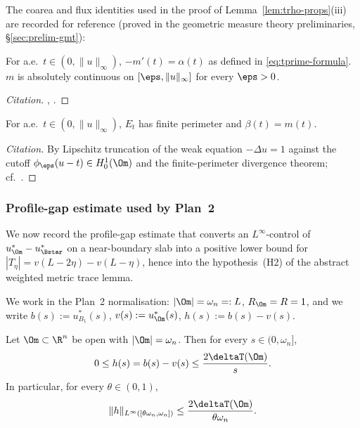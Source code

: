 The coarea and flux identities used in the proof of
Lemma~\ref{lem:trho-props}(iii) are recorded for reference (proved in
the geometric measure theory preliminaries,
\S\ref{sec:prelim-gmt}):

\begin{lemma}\label{lem:coarea-mprime}
For a.e.\ $t\in(0,\|u\|_\infty)$, $-m'(t)=\alpha(t)$ as defined in
\eqref{eq:tprime-formula}. $m$ is absolutely continuous on
$[\eps,\|u\|_\infty]$ for every $\eps>0$.
\end{lemma}

\begin{proof}[Citation]
\cite[Thm.~13.1]{Maggi2012}, \cite[Thm.~3.40]{AFP2000}.
\end{proof}

\begin{lemma}\label{lem:flux-id}
For a.e.\ $t\in(0,\|u\|_\infty)$, $E_t$ has finite perimeter and
$\beta(t)=m(t)$.
\end{lemma}

\begin{proof}[Citation]
By Lipschitz truncation of the weak equation $-\Delta u=1$ against the
cutoff $\phi_\eps(u-t)\in H^{1}_{0}(\Om)$ and the finite-perimeter
divergence theorem; cf.\ \cite[Thm.~16.3]{Maggi2012}.
\end{proof}

\subsubsection{Profile-gap estimate used by Plan~2}\label{ssec:profile-gap}

We now record the profile-gap estimate that converts an
$L^\infty$-control of $u^*_\Om-u^*_{\Bstar}$ on a near-boundary slab
into a positive lower bound for $|T_\eta|=v(L-2\eta)-v(L-\eta)$, hence
into the hypothesis~(H2) of the abstract weighted metric trace lemma.

We work in the Plan~2 normalisation: $|\Om|=\omega_n=:L$,
$R_\Om=R=1$, and we write $b(s):=u^*_{B_1}(s)$, $v(s):=u^*_\Om(s)$,
$h(s):=b(s)-v(s)$.

\begin{lemma}\label{lem:profile-gap-int}
Let $\Om\subset\R^n$ be open with $|\Om|=\omega_n$. Then for every
$s\in(0,\omega_n]$,
\begin{equation}\label{eq:profile-gap-int}
   0\le h(s)=b(s)-v(s)\le\frac{2\deltaT(\Om)}{s}.
\end{equation}
In particular, for every $\theta\in(0,1)$,
\begin{equation}\label{eq:profile-gap-slab}
   \|h\|_{L^\infty([\theta\omega_n,\omega_n])}
   \le\frac{2\deltaT(\Om)}{\theta\omega_n}.
\end{equation}
\end{lemma}

